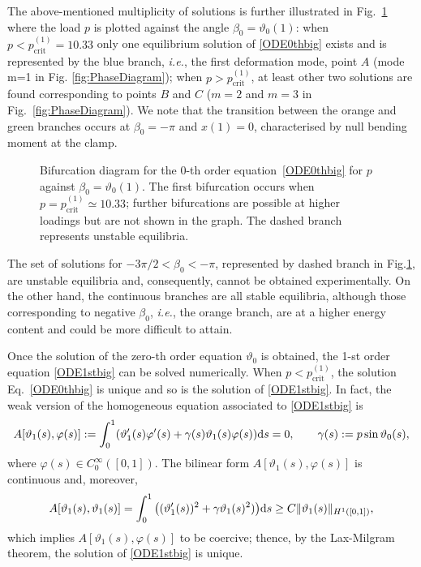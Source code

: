 \documentclass[oneside]{article}
\begin{document}
			The above-mentioned multiplicity of solutions is further illustrated in Fig.~\ref{fig:p_vs_beta_0} where the load $p$ is plotted against the angle $\beta_0=\vartheta_0(1)$: when $p<p_\text{crit}^{(1)}=10.33$ only one  equilibrium solution of \eqref{ODE0thbig} exists and is represented by the blue branch, \textit{i.e.}, the first deformation mode, point $A$  (mode m=1 in Fig. \ref{fig:PhaseDiagram}); when ${p>p_\text{crit}^{(1)}}$, at least other two solutions are found corresponding to points $B$ and $C$ ($m=2$ and $m=3$ in Fig.~\ref{fig:PhaseDiagram}). We note that the transition between the orange and green branches occurs at $\beta_0=-\pi$ and $x(1) = 0$, characterised by null bending moment at the clamp.
			\begin{figure}[h]
				\begin{center}
					\begin{tiny}
						\def\svgwidth{.7\textwidth}
						
					\end{tiny}
					\caption{Bifurcation diagram for the 0-th order equation~\eqref{ODE0thbig} for $p$ against $\beta_0=\vartheta_0(1)$. The first bifurcation occurs when $p=p_\text{crit}^{(1)}\simeq 10.33$; further bifurcations are possible at higher loadings but are not shown in the graph. The dashed branch represents unstable equilibria.}
					\label{fig:p_vs_beta_0}
				\end{center}
			\end{figure}
			The set of solutions for $-3\pi/2<\beta_0<-\pi$, represented by dashed branch in Fig.\ref{fig:p_vs_beta_0}, are unstable equilibria \cite{Levyakov2010} and, consequently, cannot be obtained experimentally. On the other hand, the continuous branches are all stable equilibria, although those corresponding to negative $\beta_0$, \textit{i.e.}, the orange branch, are at a higher energy content and could be more difficult to attain. 
			
			Once the solution of the zero-th order equation $\vartheta_0$ is obtained, the 1-st order equation \eqref{ODE1stbig} can be solved numerically. When $p<p_{\text{crit}}^{(1)}$, the solution Eq.~\eqref{ODE0thbig} is unique and so is the solution of \eqref{ODE1stbig}. In fact, the weak version of the homogeneous equation associated to \eqref{ODE1stbig} is
			\begin{equation}
			A[\vartheta_1(s),\varphi(s)]:=\int_0^1(\vartheta'_1(s)\varphi'(s)+\gamma(s)\vartheta_1(s)\varphi(s)) {\rm d}s=0, \qquad \gamma(s):=p\sin\vartheta_0(s),
			\end{equation}
			where $\varphi(s)\in C_0^\infty([0,1])$. 
			The bilinear form $A[\vartheta_1(s),\varphi(s)]$ is continuous and, moreover,
			\begin{equation}
			A[\vartheta_1(s),\vartheta_1(s)]=\int_0^1\big((\vartheta'_1(s))^2+\gamma\vartheta_1(s)^2)\big){\rm d}s\geq C\|\vartheta_1(s)\|_{H^1([0,1])},
			\end{equation}
			which implies $A[\vartheta_1(s),\varphi(s)]$ to be coercive; thence, by the Lax-Milgram theorem, the solution of  \eqref{ODE1stbig} is unique. 
			
\end{document}
